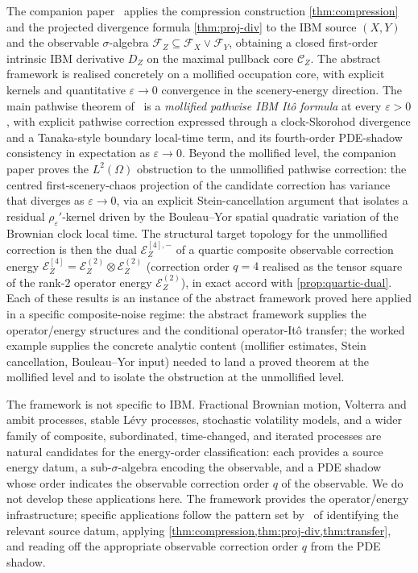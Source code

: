 \documentclass[11pt,reqno]{amsart}
\theoremstyle{plain}
\theoremstyle{definition}
\theoremstyle{remark}
\newcommand{\Energy}{\mathcal{E}}
\newcommand{\IBM}{Z}
\begin{document}
The companion paper~\cite{IBMPaper} applies the compression
construction \cref{thm:compression} and the projected divergence
formula \cref{thm:proj-div} to the IBM source $(X,Y)$ and the
observable $\sigma$-algebra
$\mathcal F_\IBM\subseteq\mathcal F_X\vee\mathcal F_Y$, obtaining a
closed first-order intrinsic IBM derivative $D_\IBM$ on the maximal
pullback core $\mathcal C_\IBM$. The abstract framework is realised
concretely on a mollified occupation core, with explicit kernels and
quantitative $\varepsilon\to 0$ convergence in the scenery-energy
direction. The main pathwise theorem of~\cite{IBMPaper} is a
\emph{mollified pathwise IBM It\^o formula} at every $\varepsilon>0$,
with explicit pathwise correction expressed through a clock-Skorohod
divergence and a Tanaka-style boundary local-time term, and its
fourth-order PDE-shadow consistency in expectation as
$\varepsilon\to 0$. Beyond the mollified level, the companion paper
proves the $L^{2}(\Omega)$ obstruction to the unmollified pathwise
correction: the centred first-scenery-chaos projection of the
candidate correction has variance that diverges as
$\varepsilon\to 0$, via an explicit Stein-cancellation argument that
isolates a residual $\rho_\varepsilon'$-kernel driven by the
Bouleau--Yor spatial quadratic variation of the Brownian clock local
time. The structural target topology for the unmollified correction
is then the dual $\Energy_\IBM^{[4],-}$ of a quartic composite
observable correction energy
$\Energy_\IBM^{[4]}=\Energy_\IBM^{(2)}\otimes\Energy_\IBM^{(2)}$
(correction order $q=4$ realised as the tensor square of the rank-$2$
operator energy $\Energy_\IBM^{(2)}$), in exact accord with
\cref{prop:quartic-dual}. Each of these results is
an instance of the abstract framework proved here applied in a
specific composite-noise regime: the abstract framework supplies the
operator/energy structures and the conditional operator-It\^o
transfer; the worked example supplies the concrete analytic content
(mollifier estimates, Stein cancellation, Bouleau--Yor input) needed
to land a proved theorem at the mollified level and to isolate the
obstruction at the unmollified level.

The framework is not specific to IBM. Fractional Brownian motion,
Volterra and ambit processes, stable L\'evy processes, stochastic
volatility models, and a wider family of composite, subordinated,
time-changed, and iterated processes are natural candidates for the
energy-order classification: each provides a source energy datum, a
sub-$\sigma$-algebra encoding the observable, and a PDE shadow whose
order indicates the observable correction order $q$ of the observable.
We do not develop these applications here. The framework provides the
operator/energy infrastructure; specific applications follow the
pattern set by~\cite{IBMPaper} of identifying the relevant source
datum, applying \cref{thm:compression,thm:proj-div,thm:transfer},
and reading off the appropriate observable correction order $q$ from
the PDE shadow.
\end{document}
